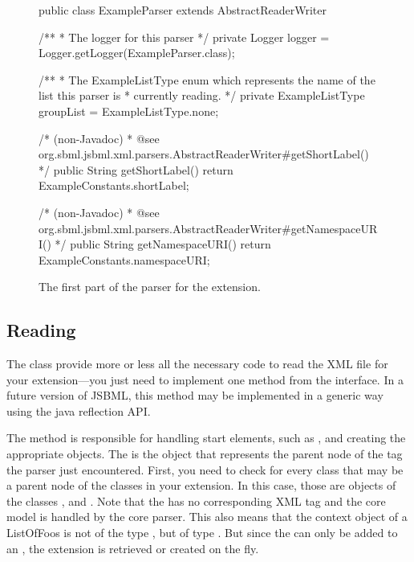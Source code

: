 \begin{figure}[htb]
  \begin{example}[numbers=left]
public class ExampleParser extends AbstractReaderWriter {

  /**
   * The logger for this parser
   */
  private Logger logger = Logger.getLogger(ExampleParser.class);

  /**
   * The ExampleListType enum which represents the name of the list this parser is
   * currently reading.
   */
  private ExampleListType groupList = ExampleListType.none;

  /* (non-Javadoc)
   * @see org.sbml.jsbml.xml.parsers.AbstractReaderWriter#getShortLabel()
   */
  public String getShortLabel() {
    return ExampleConstants.shortLabel;
  }

  /* (non-Javadoc)
   * @see org.sbml.jsbml.xml.parsers.AbstractReaderWriter#getNamespaceURI()
   */
  public String getNamespaceURI() {
    return ExampleConstants.namespaceURI;
  }

}\end{example}
 \caption{The first part of the parser for the extension.}
 \label{lst:ModelExtParserClass}
\end{figure}


\subsection{Reading}

The class  provide more or less all the necessary
code to read the XML file for your extension---you just need to implement one
method from the  interface. In a future version of JSBML, this method
may be implemented in a generic way using the java reflection API.

The  method is responsible for handling start
elements, such as , and creating the appropriate
objects.  The  is the object that represents the parent
node of the tag the parser just encountered.  First, you need to check for
every class that may be a parent node of the classes in your extension.  In
this case, those are objects of the classes \Model,  and
.  Note that the  has no corresponding XML
tag and the core model is handled by the core parser.  This also
means that the context object of a ListOfFoos is not of the type
, but of type \Model.  But since the 
can only be added to an , the extension is retrieved or
created on the fly.


